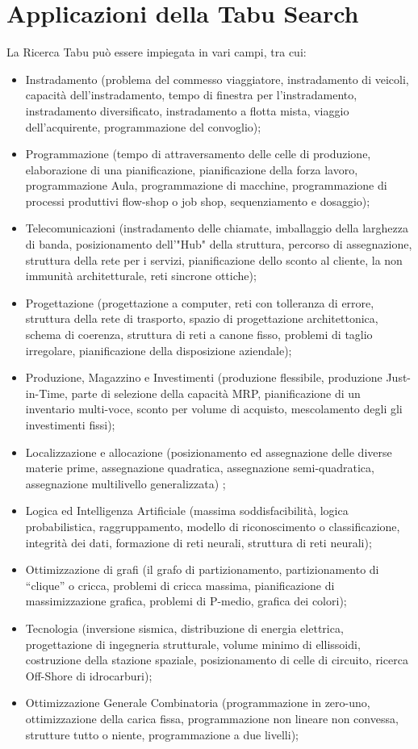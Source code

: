 \section{Applicazioni della Tabu Search}
La Ricerca Tabu può essere impiegata in vari campi, tra cui:
\begin{itemize}
\item Instradamento (problema del commesso viaggiatore, instradamento di veicoli, capacità dell'instradamento, tempo di finestra per l'instradamento, instradamento diversificato, instradamento a flotta
mista, viaggio dell'acquirente, programmazione del convoglio);
\item Programmazione (tempo di attraversamento delle celle di produzione, elaborazione di una pianificazione, pianificazione della forza lavoro, programmazione Aula, programmazione di macchine, programmazione di processi produttivi flow-shop o job shop, sequenziamento e dosaggio);
\item Telecomunicazioni (instradamento delle chiamate, imballaggio della larghezza di banda, posizionamento dell'"Hub" della struttura, percorso di assegnazione, struttura della rete per i servizi, pianificazione dello sconto al cliente, la non immunità architetturale, reti sincrone ottiche);
\item Progettazione (progettazione a computer, reti con tolleranza di errore, struttura della rete di trasporto, spazio di progettazione architettonica, schema di coerenza, struttura di reti a canone fisso, problemi di taglio irregolare, pianificazione della disposizione aziendale); 
\item Produzione, Magazzino e Investimenti (produzione flessibile, produzione Just-in-Time, parte di selezione della capacità MRP, pianificazione di un inventario multi-voce, sconto per volume di acquisto, mescolamento degli gli investimenti fissi);
\item Localizzazione e allocazione (posizionamento ed assegnazione delle diverse materie prime, assegnazione quadratica, assegnazione semi-quadratica, assegnazione multilivello generalizzata) ;
\item Logica ed Intelligenza Artificiale (massima soddisfacibilità, logica probabilistica, raggruppamento, modello di riconoscimento o classificazione, integrità dei dati, formazione di reti neurali, struttura di reti neurali); 
\item Ottimizzazione di grafi (il grafo di partizionamento, partizionamento di “clique” o cricca, problemi di cricca massima, pianificazione di massimizzazione grafica, problemi di P-medio, grafica dei colori);
\item Tecnologia (inversione sismica, distribuzione di energia elettrica, progettazione di ingegneria strutturale, volume minimo di ellissoidi, costruzione della stazione spaziale, posizionamento di celle di circuito, ricerca Off-Shore di idrocarburi); 
\item Ottimizzazione Generale Combinatoria (programmazione in zero-uno, ottimizzazione della carica fissa, programmazione non lineare non convessa, strutture tutto o niente, programmazione a due livelli);
\end{itemize}


